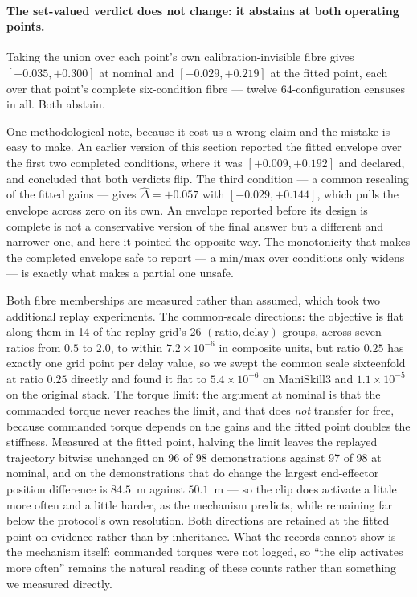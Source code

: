 \documentclass[pdflatex,iicol,sn-apa]{sn-jnl}
\theoremstyle{remark}
\begin{document}
\paragraph{The set-valued verdict does not change: it abstains at both operating points.}
Taking the union over each point's own calibration-invisible fibre gives $[-0.035, +0.300]$ at
nominal and $[-0.029, +0.219]$ at the fitted point, each over that point's complete six-condition
fibre --- twelve 64-configuration censuses in all. Both abstain.

One methodological note, because it cost us a wrong claim and the mistake is easy to make. An
earlier version of this section reported the fitted envelope over the first two completed
conditions, where it was $[+0.009, +0.192]$ and declared, and concluded that both verdicts flip. The
third condition --- a common rescaling of the fitted gains --- gives $\hat\Delta = +0.057$ with
$[-0.029, +0.144]$, which pulls the envelope across zero on its own. An envelope reported before its
design is complete is not a conservative version of the final answer but a different and narrower
one, and here it pointed the opposite way. The monotonicity that makes the completed envelope safe
to report --- a min/max over conditions only widens --- is exactly what makes a partial one unsafe.

Both fibre memberships are measured rather than assumed, which took two additional replay
experiments. The common-scale directions: the objective is flat along them in 14 of the replay
grid's 26 $(\text{ratio}, \text{delay})$ groups, across seven ratios from $0.5$ to $2.0$, to within
$7.2\times10^{-6}$ in composite units, but ratio $0.25$ has exactly one grid point per delay value,
so we swept the common scale sixteenfold at ratio $0.25$ directly and found it flat to
$5.4\times10^{-6}$ on ManiSkill3 and $1.1\times10^{-5}$ on the original stack. The torque limit: the
argument at nominal is that the commanded torque never reaches the limit, and that does \emph{not}
transfer for free, because commanded torque depends on the gains and the fitted point doubles the
stiffness. Measured at the fitted point, halving the limit leaves the replayed trajectory bitwise
unchanged on 96 of 98 demonstrations against 97 of 98 at nominal, and on the demonstrations that do
change the largest end-effector position difference is $84.5$~\textmu m against $50.1$~\textmu m ---
so the clip does activate a little more often and a little harder, as the mechanism predicts, while
remaining far below the protocol's own resolution. Both directions are retained at the fitted point
on evidence rather than by inheritance. What the records cannot show is the mechanism itself:
commanded torques were not logged, so ``the clip activates more often'' remains the natural reading
of these counts rather than something we measured directly.
\end{document}
